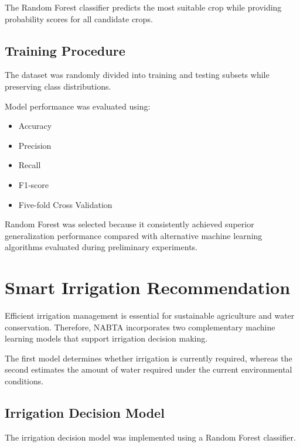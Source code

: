 The Random Forest classifier predicts the most suitable crop while providing probability scores for all candidate crops.

\subsection{Training Procedure}

The dataset was randomly divided into training and testing subsets while preserving class distributions.

Model performance was evaluated using:

\begin{itemize}[leftmargin=*]
\item Accuracy
\item Precision
\item Recall
\item F1-score
\item Five-fold Cross Validation
\end{itemize}

Random Forest was selected because it consistently achieved superior generalization performance compared with alternative machine learning algorithms evaluated during preliminary experiments.

\section{Smart Irrigation Recommendation}
\label{sec:irrigation_methodology}

Efficient irrigation management is essential for sustainable agriculture and water conservation. Therefore, NABTA incorporates two complementary machine learning models that support irrigation decision making.

The first model determines whether irrigation is currently required, whereas the second estimates the amount of water required under the current environmental conditions.

\subsection{Irrigation Decision Model}

The irrigation decision model was implemented using a Random Forest classifier.

